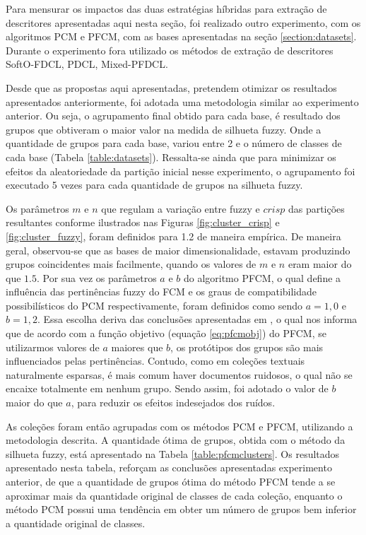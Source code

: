Para mensurar os impactos das duas estratégias híbridas para extração de descritores apresentadas
aqui nesta seção, foi realizado outro experimento, com os algoritmos PCM e PFCM, com as bases
apresentadas na seção \ref{section:datasets}. Durante o experimento fora utilizado os métodos de
extração de descritores SoftO-FDCL, PDCL, Mixed-PFDCL. 

Desde que as propostas aqui apresentadas, pretendem otimizar os resultados apresentados
anteriormente, foi adotada uma metodologia similar ao experimento anterior. Ou seja, o agrupamento
final obtido para cada base, é resultado dos grupos que obtiveram o maior valor na medida de
silhueta fuzzy. Onde a quantidade de grupos para cada base, variou entre 2 e o número de classes
de cada base (Tabela \ref{table:datasets}). Ressalta-se ainda que para minimizar os efeitos da
aleatoriedade da partição inicial nesse experimento, o agrupamento foi executado 5 vezes para cada
quantidade de grupos na silhueta fuzzy. 

Os parâmetros $m$ e $n$ que regulam a variação entre fuzzy e $crisp$ das partições resultantes
conforme ilustrados nas Figuras \ref{fig:cluster_crisp} e \ref{fig:cluster_fuzzy}, foram definidos
para 1.2 de maneira empírica. De maneira geral, observou-se que as bases de maior dimensionalidade,
estavam produzindo grupos coincidentes mais facilmente, quando os valores de $m$ e $n$ eram maior do
que $1.5$. Por sua vez os parâmetros $a$ e $b$ do algoritmo PFCM, o qual define a influência das
pertinências fuzzy do FCM e os graus de compatibilidade possibilísticos do PCM respectivamente,
foram definidos como sendo $a = 1,0$ e $b = 1,2$. Essa escolha deriva das conclusões apresentadas
em , o qual nos informa que de acordo com a função objetivo (equação
\ref{eq:pfcmobj}) do PFCM, se utilizarmos valores de $a$ maiores que $b$, os protótipos dos grupos
são mais influenciados pelas pertinências. Contudo, como em coleções textuais 
naturalmente esparsas, é mais comum haver documentos ruidosos, o qual não se encaixe totalmente em
nenhum grupo. Sendo assim, foi adotado o valor de $b$ maior do que $a$, para reduzir os efeitos
indesejados dos ruídos.

As coleções foram então agrupadas com os métodos PCM e PFCM, utilizando a metodologia descrita. A
quantidade ótima de grupos, obtida com o método da silhueta fuzzy, está apresentado na Tabela
\ref{table:pfcmclusters}. Os resultados apresentado nesta tabela, reforçam as conclusões
apresentadas experimento anterior, de que a quantidade de grupos ótima do método PFCM tende a se
aproximar mais da quantidade original de classes de cada coleção, enquanto o método PCM possui uma
tendência em obter um número de grupos bem inferior a quantidade original de classes.

